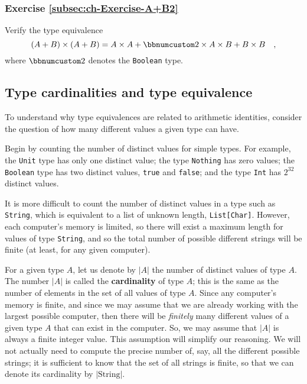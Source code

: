 \subsubsection{Exercise \label{subsec:ch-Exercise-A+B2}\ref{subsec:ch-Exercise-A+B2}}

Verify the type equivalence 
\[
\left(A+B\right)\times\left(A+B\right)=A\times A+\bbnum 2\times A\times B+B\times B\quad,
\]
where $\bbnum 2$ denotes the \lstinline!Boolean! type.

\subsection{Type cardinalities and type equivalence}

To understand why type equivalences are related to arithmetic identities,
consider the question of how many different values a given type can
have.

Begin by counting the number of distinct values for simple types.
For example, the \lstinline!Unit! type has only one distinct value;
the type \lstinline!Nothing! has zero values; the \lstinline!Boolean!
type has two distinct values, \lstinline!true! and \lstinline!false!;
and the type \lstinline!Int! has $2^{32}$ distinct values.

It is more difficult to count the number of distinct values in a type
such as \lstinline!String!, which is equivalent to a list of unknown
length, \lstinline!List[Char]!. However, each computer's memory is
limited, so there will exist a maximum length for values of type \lstinline!String!,
and so the total number of possible different strings will be finite
(at least, for any given computer).

For a given type $A$, let us denote by $\left|A\right|$ the number
of distinct values of type $A$. The number $\left|A\right|$ is called
the \textbf{cardinality} of type $A$; this is
the same as the number of elements in the set of all values of type
$A$. Since any computer's memory is finite, and since we may assume
that we are already working with the largest possible computer, then
there will be \emph{finitely} many different values of a given type
$A$ that can exist in the computer. So, we may assume that $\left|A\right|$
is always a finite integer value. This assumption will simplify our
reasoning. We will not actually need to compute the precise number
of, say, all the different possible strings; it is sufficient to know
that the set of all strings is finite, so that we can denote its cardinality
by $\left|\text{String}\right|$.

